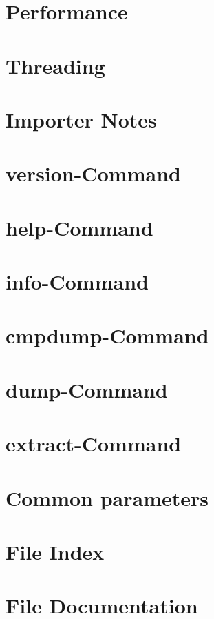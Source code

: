 \documentclass[twoside]{book}
\newcommand{\+}{\discretionary{\mbox{\scriptsize$\hookleftarrow$}}{}{}}
\newcommand{\clearemptydoublepage}{%
  \newpage{\pagestyle{empty}\cleardoublepage}%
}
\begin{document}
\chapter{Performance}
\label{perf}
\hypertarget{perf}{}

\chapter{Threading}
\label{threading}
\hypertarget{threading}{}

\chapter{Importer Notes}
\label{importer_notes}
\hypertarget{importer_notes}{}

\chapter{\textquotesingle{}version\textquotesingle{}-\/\+Command}
\label{version}
\hypertarget{version}{}

\chapter{\textquotesingle{}help\textquotesingle{}-\/\+Command}
\label{help}
\hypertarget{help}{}

\chapter{\textquotesingle{}info\textquotesingle{}-\/\+Command}
\label{iinfo}
\hypertarget{iinfo}{}

\chapter{\textquotesingle{}cmpdump\textquotesingle{}-\/\+Command}
\label{cmpdump}
\hypertarget{cmpdump}{}

\chapter{\textquotesingle{}dump\textquotesingle{}-\/\+Command}
\label{dump}
\hypertarget{dump}{}

\chapter{\textquotesingle{}extract\textquotesingle{}-\/\+Command}
\label{extract}
\hypertarget{extract}{}

\chapter{Common parameters}
\label{common}
\hypertarget{common}{}

\chapter{File Index}

\chapter{File Documentation}



\backmatter
\newpage
{}
\clearemptydoublepage
{}
\printindex
\end{document}
